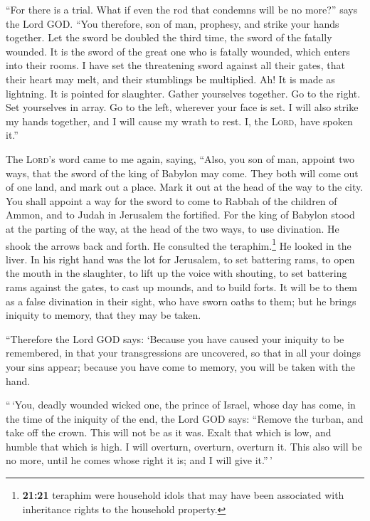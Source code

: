  ``For there is a trial. What if even the rod that
condemns will be no more?'' says the Lord GOD.  ``You
therefore, son of man, prophesy, and strike your hands together. Let the
sword be doubled the third time, the sword of the fatally wounded. It is
the sword of the great one who is fatally wounded, which enters into
their rooms.  I have set the threatening sword against
all their gates, that their heart may melt, and their stumblings be
multiplied. Ah! It is made as lightning. It is pointed for slaughter.
 Gather yourselves together. Go to the right. Set
yourselves in array. Go to the left, wherever your face is set.
 I will also strike my hands together, and I will cause
my wrath to rest. I, the \textsc{Lord}, have spoken it.''

 The \textsc{Lord}'s word came to me again, saying,
 ``Also, you son of man, appoint two ways, that the sword
of the king of Babylon may come. They both will come out of one land,
and mark out a place. Mark it out at the head of the way to the city.
 You shall appoint a way for the sword to come to Rabbah
of the children of Ammon, and to Judah in Jerusalem the fortified.
 For the king of Babylon stood at the parting of the way,
at the head of the two ways, to use divination. He shook the arrows back
and forth. He consulted the teraphim.\footnote{\textbf{21:21} teraphim
  were household idols that may have been associated with inheritance
  rights to the household property.} He looked in the liver.
 In his right hand was the lot for Jerusalem, to set
battering rams, to open the mouth in the slaughter, to lift up the voice
with shouting, to set battering rams against the gates, to cast up
mounds, and to build forts.  It will be to them as a
false divination in their sight, who have sworn oaths to them; but he
brings iniquity to memory, that they may be taken.

 ``Therefore the Lord GOD says: `Because you have caused
your iniquity to be remembered, in that your transgressions are
uncovered, so that in all your doings your sins appear; because you have
come to memory, you will be taken with the hand.

 ``\,`You, deadly wounded wicked one, the prince of
Israel, whose day has come, in the time of the iniquity of the end,
 the Lord GOD says: ``Remove the turban, and take off the
crown. This will not be as it was. Exalt that which is low, and humble
that which is high.  I will overturn, overturn, overturn
it. This also will be no more, until he comes whose right it is; and I
will give it.''\,'


